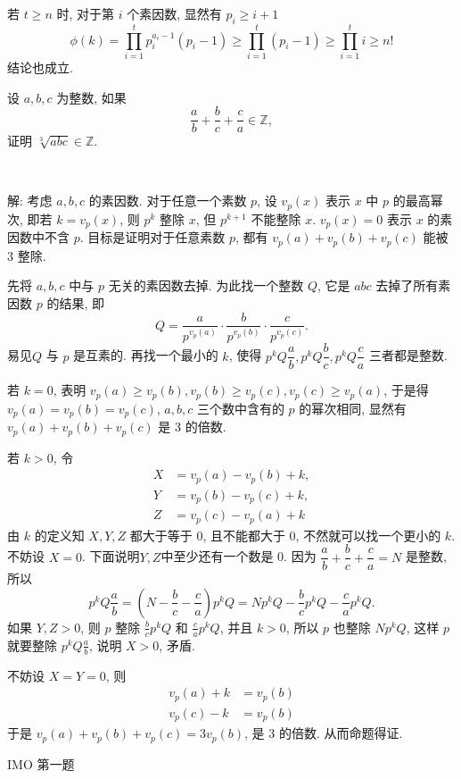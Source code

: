 若 $t \ge n$ 时, 对于第 $i$ 个素因数, 显然有 $p_i \ge i + 1$
\[\phi(k) = \prod_{i=1}^t{p_i^{a_i-1}(p_i-1)} \ge \prod_{i=1}^t(p_i-1) \ge \prod_{i=1}^t i \ge n!\]
结论也成立.


\newpage
设 $a,b,c$ 为整数, 如果 
\[ \frac{a}{b} + \frac{b}{c} + \frac{c}{a} \in \mathbb{Z} ,\]
证明 $\sqrt[3]{abc} \in \mathbb{Z} $.

~

解: 考虑 $a,b,c$ 的素因数. 对于任意一个素数 $p$, 设 $v_p(x)$ 表示 $x$ 中 $p$ 的最高幂次, 即若 $k = v_p(x)$, 则 $p^k$ 整除 $x$, 但 $p^{k+1}$ 不能整除 $x$. $v_p(x) = 0$ 表示 $x$ 的素因数中不含 $p$. 目标是证明对于任意素数 $p$, 都有 $v_p(a) + v_p(b) + v_p(c)$ 能被 $3$ 整除.

先将 $a,b,c$ 中与 $p$ 无关的素因数去掉. 为此找一个整数 $Q$, 它是 $abc$ 去掉了所有素因数 $p$ 的结果, 即
\[ Q = \frac{a}{p^{v_p(a)}}\cdot\frac{b}{p^{v_p(b)}}\cdot\frac{c}{p^{v_p(c)}} .\]
易见$Q$ 与 $p$ 是互素的. 再找一个最小的 $k$, 使得 $p^kQ\dfrac{a}{b}, p^kQ\dfrac{b}{c}, p^kQ\dfrac{c}{a}$ 三者都是整数.

若 $k = 0$, 表明 $v_p(a) \ge v_p(b), v_p(b) \ge v_p(c), v_p(c) \ge v_p(a)$, 于是得 $v_p(a) = v_p(b) = v_p(c)$, $a,b,c$ 三个数中含有的 $p$ 的幂次相同, 显然有 $v_p(a) + v_p(b) + v_p(c)$ 是 $3$ 的倍数.

若 $k > 0$, 令 
\begin{align*}
X &= v_p(a) - v_p(b) + k, \\
Y &= v_p(b) - v_p(c) + k, \\
Z &= v_p(c) - v_p(a) + k
\end{align*} 
由 $k$ 的定义知 $X,Y,Z$ 都大于等于 0, 且不能都大于 0, 不然就可以找一个更小的 $k$. 不妨设 $X = 0$. 下面说明$Y,Z$中至少还有一个数是 0. 因为 $\dfrac{a}{b}+\dfrac{b}{c}+\dfrac{c}{a} = N$ 是整数, 所以 
\[ p^kQ\frac{a}{b} = (N - \frac{b}{c} - \frac{c}{a})p^kQ = Np^kQ - \frac{b}{c}p^kQ - \frac{c}{a}p^kQ .\]
如果 $Y,Z > 0$, 则 $p$ 整除 $\frac{b}{c}p^kQ$ 和 $\frac{c}{a}p^kQ$, 并且 $k > 0$, 所以 $p$ 也整除 $Np^kQ$, 这样 $p$ 就要整除 $p^kQ\frac{a}{b}$, 说明 $X > 0$, 矛盾.

不妨设 $X = Y = 0$, 则 
\begin{align*}
v_p(a) + k &= v_p(b) \\
v_p(c) - k &= v_p(b) 
\end{align*}
于是 $v_p(a) + v_p(b) + v_p(c) = 3v_p(b)$, 是 $3$ 的倍数. 从而命题得证.

\newpage
 IMO 第一题

